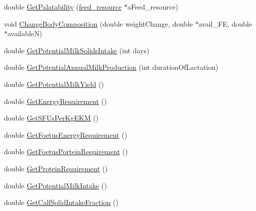 \begin{DoxyCompactItemize}
\item 
double \hyperlink{classdk__cattle_a7ab0e6b1bce961a575452a47d6ac5650}{GetPalatability} (\hyperlink{classfeed__resource}{feed\_\-resource} $\ast$aFeed\_\-resource)
\item 
void \hyperlink{classdk__cattle_a35db725cc6cf6fbf73528a1a439f8a0e}{ChangeBodyComposition} (double weightChange, double $\ast$avail\_\-FE, double $\ast$availableN)
\item 
double \hyperlink{classdk__cattle_acc1c7aa22dd7ef017d1ab063bd180f35}{GetPotentialMilkSolidsIntake} (int days)
\item 
double \hyperlink{classdk__cattle_a21fa59d45d64b1aa106d3e4e2912550a}{GetPotentialAnnualMilkProduction} (int durationOfLactation)
\item 
double \hyperlink{classdk__cattle_aba7df82a62a25f831a662e6377f97224}{GetPotentialMilkYield} ()
\item 
double \hyperlink{classdk__cattle_a95c52a8ad9b041ebbf28613c7f1b144a}{GetEnergyRequirement} ()
\item 
double \hyperlink{classdk__cattle_af804b9a5a6885aea3e7aaee3b098c043}{GetSFUsPerKgEKM} ()
\item 
double \hyperlink{classdk__cattle_a704850ee7a8dbc5637f87c1de6a2fdf5}{GetFoetusEnergyRequirement} ()
\item 
double \hyperlink{classdk__cattle_a0c08a3cb85354d4ae2bfb57b1d06a7fe}{GetFoetusPorteinRequirement} ()
\item 
double \hyperlink{classdk__cattle_a578f816fbeb4c0350d26f9a16f2cae41}{GetProteinRequirement} ()
\item 
double \hyperlink{classdk__cattle_ac3beb86fb1736f85fc2330f31bb5bfee}{GetPotentialMilkIntake} ()
\item 
double \hyperlink{classdk__cattle_a419381e2c60d8fafc3d1ba70a73994e7}{GetCalfSolidIntakeFraction} ()
\end{DoxyCompactItemize}
